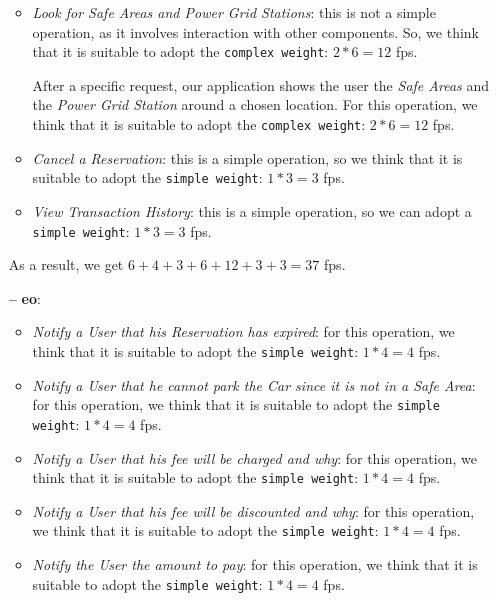 \begin{itemize}
\begin{itemize}
	\item \textit{Look for Safe Areas and Power Grid Stations}: this is not a simple operation, as it involves interaction with other components. So, we think that it is suitable to adopt the \texttt{complex weight}: $2 * 6 = 12$ \acs{fp}s.
	
	After a specific request, our application shows the user the \textit{Safe Areas} and the \textit{Power Grid Station}  around a chosen location. For this operation, we think that it is suitable to adopt the \texttt{complex weight}: $2 * 6 = 12$ \acs{fp}s.

	\item \textit{Cancel a Reservation}: this is a simple operation, so we think that it is suitable to adopt the \texttt{simple weight}: $1 * 3 = 3$ \acs{fp}s.
	
	\item \textit{View Transaction History}: this is a simple operation, so we can adopt a \texttt{simple weight}: $1 * 3 = 3$ \acs{fp}s.

\end{itemize}

As a result, we get $6 + 4 + 3 + 6 + 12 + 3 + 3= 37$ \acs{fp}s.

\item[\textbf{--}] \textbf{\acl{eo}}: 

\begin{itemize}

	\item \textit{Notify a User that his Reservation has expired}: for this operation, we think that it is suitable to adopt the \texttt{simple weight}: $1 * 4 = 4$ \acs{fp}s.

	\item \textit{Notify a User that he cannot park the Car since it is not in a Safe Area}: for this operation, we think that it is suitable to adopt the \texttt{simple weight}: $1 * 4 = 4$ \acs{fp}s.	
	
	\item \textit{Notify a User that his fee will be charged and why}: for this operation, we think that it is suitable to adopt the \texttt{simple weight}: $1 * 4 = 4$ \acs{fp}s.
	
	\item \textit{Notify a User that his fee will be discounted and why}: for this operation, we think that it is suitable to adopt the \texttt{simple weight}: $1 * 4 = 4$ \acs{fp}s.
	
	\item \textit{Notify the User the amount to pay}:  for this operation, we think that it is suitable to adopt the \texttt{simple weight}: $1 * 4 = 4$ \acs{fp}s.


\end{itemize}
\end{itemize}
